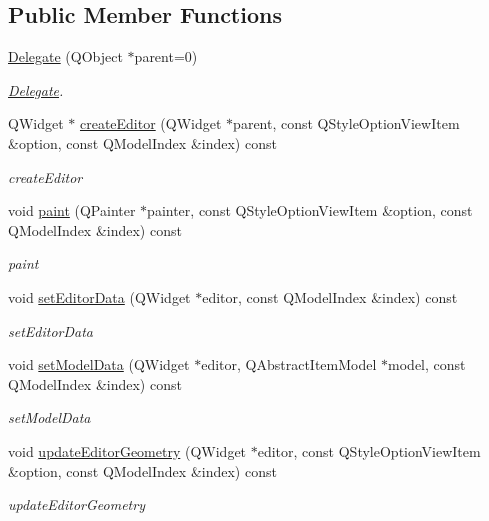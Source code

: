 \subsection*{Public Member Functions}
\begin{DoxyCompactItemize}
\item 
\hyperlink{class_delegate_a63c7694c7a15f36e0efdda9c98aff213}{Delegate} (Q\+Object $\ast$parent=0)
\begin{DoxyCompactList}\small\item\em \hyperlink{class_delegate}{Delegate}. \end{DoxyCompactList}\item 
Q\+Widget $\ast$ \hyperlink{class_delegate_a3abc4fe9f16fa7c5e64ffcf48cced054}{create\+Editor} (Q\+Widget $\ast$parent, const Q\+Style\+Option\+View\+Item \&option, const Q\+Model\+Index \&index) const
\begin{DoxyCompactList}\small\item\em create\+Editor \end{DoxyCompactList}\item 
void \hyperlink{class_delegate_aa0cd2ab8835da9babcce38a1a8210375}{paint} (Q\+Painter $\ast$painter, const Q\+Style\+Option\+View\+Item \&option, const Q\+Model\+Index \&index) const
\begin{DoxyCompactList}\small\item\em paint \end{DoxyCompactList}\item 
void \hyperlink{class_delegate_a49e08030f9cb8fbd9ccdb93aae72519e}{set\+Editor\+Data} (Q\+Widget $\ast$editor, const Q\+Model\+Index \&index) const
\begin{DoxyCompactList}\small\item\em set\+Editor\+Data \end{DoxyCompactList}\item 
void \hyperlink{class_delegate_a48c016a282f7e873ad6f1023111236eb}{set\+Model\+Data} (Q\+Widget $\ast$editor, Q\+Abstract\+Item\+Model $\ast$model, const Q\+Model\+Index \&index) const
\begin{DoxyCompactList}\small\item\em set\+Model\+Data \end{DoxyCompactList}\item 
void \hyperlink{class_delegate_a614a1d4dfd4ca3a88faf7aa54ee8ecbf}{update\+Editor\+Geometry} (Q\+Widget $\ast$editor, const Q\+Style\+Option\+View\+Item \&option, const Q\+Model\+Index \&index) const
\begin{DoxyCompactList}\small\item\em update\+Editor\+Geometry \end{DoxyCompactList}\end{DoxyCompactItemize}


